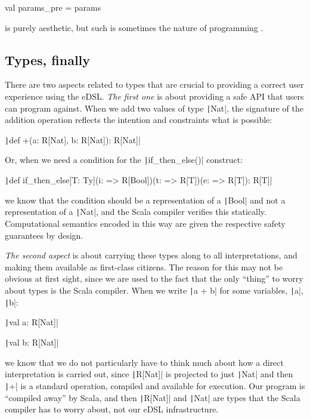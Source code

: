 \documentclass[11pt]{article}
\newcommand{\Scala}[1]{\texttt|#1|}
\newcommand{\ScalaI}[1]{\texttt|#1|}
\newcommand{\OneTwoThreeX}[1]{\marginpar{\faCubes{ \smaller #1}}\xspace}
\newcommand{\OneTwoThree}{\OneTwoThreeX{}}
\newcommand{\FirstEtcX}[1]{\marginpar{\faCube{ \smaller #1}}\xspace}
\newcommand{\FirstEtc}{\FirstEtcX{}}
\begin{document}
\begin{ScalaBlockSimple}
val params_pre = params
\end{ScalaBlockSimple}

\noindent is purely aesthetic, but such is sometimes the nature of 
programming \cite{knuth:turing:lecture}.


\subsection{Types, finally}
\label{sec:types}
There are two\OneTwoThree aspects related to types that are crucial to 
providing a correct user experience using the eDSL. \textit{The first 
one}\FirstEtc is about providing a safe API that users can program against. 
When we add two values of type \ScalaI{Nat}, the signature of the addition 
operation reflects the intention and constraints what is possible:

\ScalaI{def +(a: R[Nat], b: R[Nat]): R[Nat]}

\noindent Or, when we need a condition for the \ScalaI{if_then_else()} 
construct:

\ScalaI{def if_then_else[T: Ty](i: => R[Bool])(t: => R[T])(e: => R[T]): R[T]}

\noindent we know that the condition should be a representation of a 
\ScalaI{Bool} and not a representation of a \ScalaI{Nat}, and the Scala 
compiler verifies this statically. Computational semantics encoded in this 
way are given the respective safety guarantees by design.

\textit{The second aspect}\FirstEtc is about carrying these types along to 
all interpretations, and making them available as first-class citizens. The 
reason for this may not be obvious at first sight, since we are used to the 
fact that the only ``thing'' to worry about types is the Scala compiler. When 
we write \ScalaI{a + b} for some variables, \ScalaI{a}, \ScalaI{b}:

\ScalaI{val a: R[Nat]}

\ScalaI{val b: R[Nat]}

we know that we do not particularly have to think much about how a direct 
interpretation is carried out, since \ScalaI{R[Nat]} is projected to just 
\Scala{Nat} and then \ScalaI{+} is a standard operation, compiled and 
available for execution. Our program is ``compiled away'' by Scala, and then 
\ScalaI{R[Nat]} and \ScalaI{Nat} are types that the Scala compiler has to 
worry about, not our eDSL infrastructure.
\end{document}
